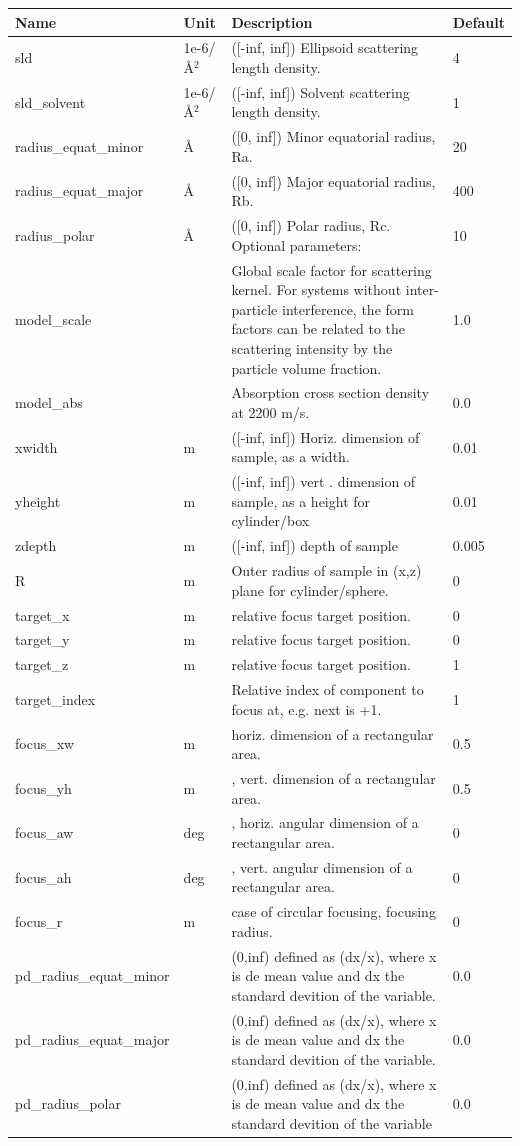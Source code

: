 \begin{longtable}{p{}p{}p{}p{}}
\toprule
\textbf{Name} & \textbf{Unit} & \textbf{Description} & \textbf{Default} \\
\midrule
\endhead
sld & 1e-6/\AA{}$^{2}$ & ([-inf, inf]) Ellipsoid scattering length density. & 4 \\
sld\_solvent & 1e-6/\AA{}$^{2}$ & ([-inf, inf]) Solvent scattering length density. & 1 \\
radius\_equat\_minor & \AA{} & ([0, inf]) Minor equatorial radius, Ra. & 20 \\
radius\_equat\_major & \AA{} & ([0, inf]) Major equatorial radius, Rb. & 400 \\
radius\_polar & \AA{} & ([0, inf]) Polar radius, Rc. Optional parameters: & 10 \\
model\_scale &   & Global scale factor for scattering kernel. For systems without inter-particle interference, the form factors can be related to the scattering intensity by the particle volume fraction. & 1.0 \\
model\_abs &   & Absorption cross section density at 2200 m/s. & 0.0 \\
xwidth & m & ([-inf, inf]) Horiz. dimension of sample, as a width. & 0.01 \\
yheight & m & ([-inf, inf]) vert . dimension of sample, as a height for cylinder/box & 0.01 \\
zdepth & m & ([-inf, inf]) depth of sample & 0.005 \\
R & m & Outer radius of sample in (x,z) plane for cylinder/sphere. & 0 \\
target\_x & m & relative focus target position. & 0 \\
target\_y & m & relative focus target position. & 0 \\
target\_z & m & relative focus target position. & 1 \\
target\_index &   & Relative index of component to focus at, e.g. next is +1. & 1 \\
focus\_xw & m & horiz. dimension of a rectangular area. & 0.5 \\
focus\_yh & m & , vert. dimension of a rectangular area. & 0.5 \\
focus\_aw & deg & , horiz. angular dimension of a rectangular area. & 0 \\
focus\_ah & deg & , vert. angular dimension of a rectangular area. & 0 \\
focus\_r & m & case of circular focusing, focusing radius. & 0 \\
pd\_radius\_equat\_minor &  & (0,inf) defined as (dx/x), where x is de mean value and dx the standard devition of the variable. & 0.0 \\
pd\_radius\_equat\_major &  & (0,inf) defined as (dx/x), where x is de mean value and dx the standard devition of the variable. & 0.0 \\
pd\_radius\_polar &  & (0,inf) defined as (dx/x), where x is de mean value and dx the standard devition of the variable & 0.0 \\
\bottomrule
\end{longtable}

